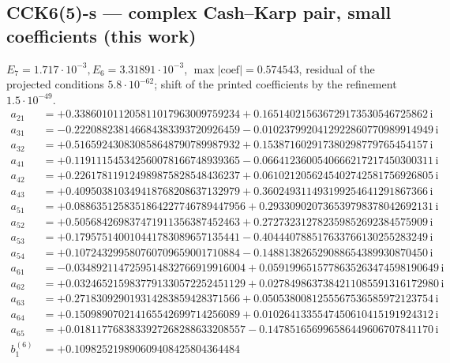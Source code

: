 \subsection*{CCK6(5)-s --- complex Cash--Karp pair, small coefficients (this work)}
$E_{7}=1.717\cdot10^{-3}, E_{6}=3.31891\cdot10^{-3}$, $\max|\text{coef}|=0.574543$, residual of the projected conditions $5.8\cdot10^{-62}$; shift of the printed coefficients by the refinement $1.5\cdot10^{-49}$. 
{\small
\begin{align*}
a_{21} &= +0.338601011205811017963009759234 + 0.165140215636729173530546725862\,\mathrm{i}\\
a_{31} &= -0.222088238146684383393720926459 - 0.0102379920412922860770989914949\,\mathrm{i}\\
a_{32} &= +0.516592430830858648790789987932 + 0.153871602917380298779765454157\,\mathrm{i}\\
a_{41} &= +0.119111545342560078166748939365 - 0.0664123600540666217217450300311\,\mathrm{i}\\
a_{42} &= +0.226178119124989875828548436237 + 0.0610212056245402742581756926805\,\mathrm{i}\\
a_{43} &= +0.409503810349418768208637132979 + 0.360249311493199254641291867366\,\mathrm{i}\\
a_{51} &= +0.0886351258351864227746789447956 + 0.293309020736539798378042692131\,\mathrm{i}\\
a_{52} &= +0.505684269837471911356387452463 + 0.272732312782359852692384575909\,\mathrm{i}\\
a_{53} &= +0.179575140010441783089657135441 - 0.404440788517633766130255283249\,\mathrm{i}\\
a_{54} &= +0.107243299580760709659001710884 - 0.148813826529088654389930870450\,\mathrm{i}\\
a_{61} &= -0.0348921147259514832766919916004 + 0.0591996515778635263474598190649\,\mathrm{i}\\
a_{62} &= +0.0324652159837791330572252451129 + 0.0278498637384211085591316172980\,\mathrm{i}\\
a_{63} &= +0.271830929019314283859428371566 + 0.0505380081255567536585972123754\,\mathrm{i}\\
a_{64} &= +0.150989070214165542699714256089 + 0.0102641335547450610415191924312\,\mathrm{i}\\
a_{65} &= +0.0181177683833927268288633208557 - 0.147851656996586449606707841170\,\mathrm{i}\\[1mm]
b^{(6)}_{1} &= +0.109825219890609408425804364484\\

\end{align*}}
